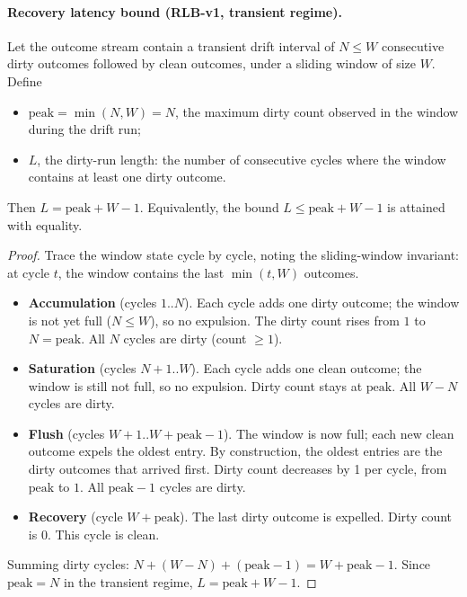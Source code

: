\documentclass[acmsmall,nonacm=true,review=false]{acmart}
\theoremstyle{plain}
\begin{document}
\paragraph{Recovery latency bound (RLB-v1, transient regime).}
Let the outcome stream contain a transient drift interval of
$N \le W$ consecutive dirty outcomes followed by clean outcomes,
under a sliding window of size $W$. Define
\begin{itemize}[noitemsep,topsep=2pt]
\item $\mathrm{peak} = \min(N, W) = N$, the maximum dirty count
      observed in the window during the drift run;
\item $L$, the dirty-run length: the number of consecutive cycles
      where the window contains at least one dirty outcome.
\end{itemize}
Then $L = \mathrm{peak} + W - 1$. Equivalently, the bound
$L \le \mathrm{peak} + W - 1$ is attained with equality.

\begin{proof}
Trace the window state cycle by cycle, noting the sliding-window
invariant: at cycle $t$, the window contains the last
$\min(t, W)$ outcomes.
\begin{itemize}
  \item \textbf{Accumulation} (cycles $1..N$). Each cycle adds one
        dirty outcome; the window is not yet full ($N \le W$), so
        no expulsion. The dirty count rises from $1$ to
        $N = \mathrm{peak}$. All $N$ cycles are dirty (count $\ge 1$).
  \item \textbf{Saturation} (cycles $N+1..W$). Each cycle adds one
        clean outcome; the window is still not full, so no
        expulsion. Dirty count stays at $\mathrm{peak}$. All
        $W - N$ cycles are dirty.
  \item \textbf{Flush} (cycles $W+1..W+\mathrm{peak}-1$). The
        window is now full; each new clean outcome expels the
        oldest entry. By construction, the oldest entries are the
        dirty outcomes that arrived first. Dirty count decreases
        by 1 per cycle, from $\mathrm{peak}$ to $1$. All
        $\mathrm{peak} - 1$ cycles are dirty.
  \item \textbf{Recovery} (cycle $W+\mathrm{peak}$). The last
        dirty outcome is expelled. Dirty count is $0$. This cycle
        is clean.
\end{itemize}
Summing dirty cycles: $N + (W - N) + (\mathrm{peak} - 1) = W + \mathrm{peak} - 1$.
Since $\mathrm{peak} = N$ in the transient regime,
$L = \mathrm{peak} + W - 1$. \qedhere
\end{proof}
\end{document}
